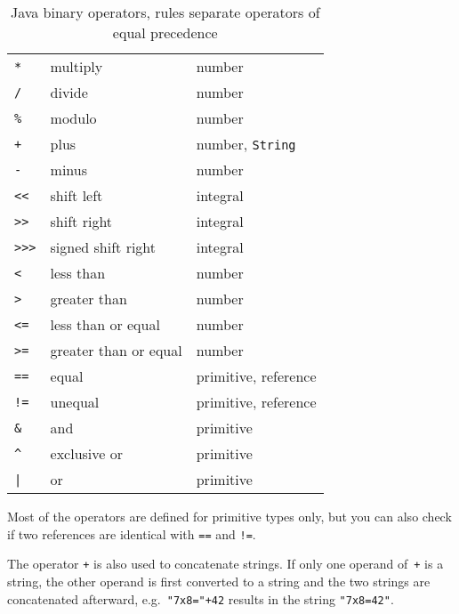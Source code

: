 \begin{table}
  \begin{center}
    \begin{tabular}{lll}
      \texttt{*} & multiply & number \\
      \texttt{/} & divide & number \\
      \texttt{\%} & modulo & number \\\hline
      \texttt{+} & plus & number, \texttt{String} \\
      \texttt{-} & minus & number \\\hline
      \texttt{<<} & shift left & integral \\
      \texttt{>>} & shift right & integral \\
      \texttt{>>>} & signed shift right & integral \\\hline
      \texttt{<} & less than & number \\
      \texttt{>} & greater than & number \\
      \texttt{<=} & less than or equal & number \\
      \texttt{>=} & greater than or equal & number \\\hline
      \texttt{==} & equal & primitive, reference \\
      \texttt{!=} & unequal & primitive, reference \\\hline
      \texttt{\&} & and & primitive \\\hline
      \texttt{\^{}} & exclusive or & primitive \\\hline
      \texttt{|} & or & primitive \\
    \end{tabular}
  \end{center}
  \caption{Java binary operators,
    rules separate operators of equal precedence}
  \label{tab:operators}
\end{table}

Most of the operators are defined for primitive types only,
but you can also check if two references are identical with
\texttt{==} and \texttt{!=}.


The operator \texttt{+}
is also used to concatenate strings. If only one operand
of~\texttt{+} is a string, the other operand is first
converted to a string and the two strings are concatenated
afterward, e.g.\ \texttt{"7x8="+42} results in the string
\texttt{"7x8=42"}.

